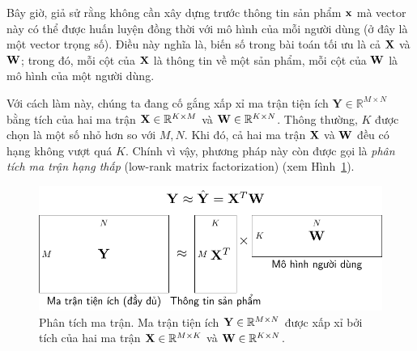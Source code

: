 Bây giờ, giả sử rằng không cần xây dựng trước thông tin sản phẩm
$\mathbf{x}$ mà vector này có thể được huấn luyện đồng thời với mô hình của mỗi người dùng (ở đây là một vector trọng số). Điều này nghĩa là, biến số trong bài toán tối ưu là cả
$\mathbf{X}$ và $\mathbf{W}$; trong đó,
mỗi cột của $\mathbf{X}$ là thông tin về một sản phẩm, mỗi cột của $\mathbf{W}$ là mô hình của một người dùng.


Với cách làm này, chúng ta đang cố gắng xấp xỉ ma trận tiện ích $\mathbf{Y} \in
\mathbb{R}^{M \times N}$ bằng tích của hai ma trận $\mathbf{X}\in
\mathbb{R}^{K\times M}$ và $\mathbf{W} \in \mathbb{R}^{K \times N}$. Thông
thường, $K$ được chọn là một số nhỏ hơn so với $M, N$. Khi đó, cả hai
ma trận $\mathbf{X}$ và $\mathbf{W}$ đều có hạng không vượt quá $K$. Chính vì
vậy, phương pháp này còn được gọi là \textit{phân tích ma trận hạng thấp} ({low-rank matrix factorization}) (xem
Hình~\ref{fig:25_1}).
\begin{figure}[t]
\centering
\includegraphics[width = .7\textwidth]{Chapters/06_RecommendationSystems/25_mf/latex/mf1.pdf}
\caption[]{Phân tích ma trận. Ma trận tiện ích $\mathbf{Y} \in
\mathbb{R}^{M\times N}$ được
xấp xỉ bởi tích của hai ma trận $\mathbf{X} \in \mathbb{R}^{M\times K}$ và
$\mathbf{W} \in \mathbb{R}^{K\times N}$.}
\label{fig:25_1}
\end{figure}

